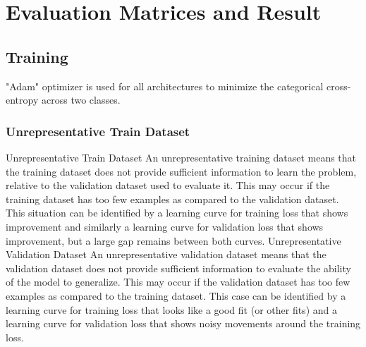 \chapter{Evaluation Matrices and Result} 
\label{evaluation} 

\section{Training}
"Adam" optimizer is used for all architectures to minimize the categorical cross-entropy across two classes.

\subsection{Unrepresentative Train Dataset}

Unrepresentative Train Dataset
An unrepresentative training dataset means that the training dataset does not provide sufficient information to learn the problem, relative to the validation dataset used to evaluate it.
This may occur if the training dataset has too few examples as compared to the validation dataset.
This situation can be identified by a learning curve for training loss that shows improvement and similarly a learning curve for validation loss that shows improvement, but a large gap remains between both curves.
Unrepresentative Validation Dataset
An unrepresentative validation dataset means that the validation dataset does not provide sufficient information to evaluate the ability of the model to generalize.
This may occur if the validation dataset has too few examples as compared to the training dataset.
This case can be identified by a learning curve for training loss that looks like a good fit (or other fits) and a learning curve for validation loss that shows noisy movements around the training loss.


